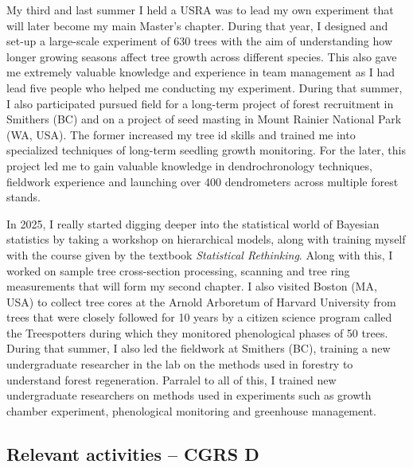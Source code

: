 \documentclass{article}
\begin{document}
My third and last summer I held a USRA was to lead my own experiment that will later become my main Master's chapter. During that year, I designed and set-up a large-scale experiment of 630 trees with the aim of understanding how longer growing seasons affect tree growth across different species. This also gave me extremely valuable knowledge and experience in team management as I had lead five people who helped me conducting my experiment. During that summer, I also participated pursued field for a long-term project of forest recruitment in Smithers (BC) and on a project of seed masting in Mount Rainier National Park (WA, USA). The former increased my tree id skills and trained me into specialized techniques of long-term seedling growth monitoring. For the later, this project led me to gain valuable knowledge in dendrochronology techniques, fieldwork experience and launching over 400 dendrometers across multiple forest stands. 

In 2025, I really started digging deeper into the statistical world of Bayesian statistics by taking a workshop on hierarchical models, along with training myself with the course given by the textbook \textit{Statistical Rethinking}. Along with this, I worked on sample tree cross-section processing, scanning and tree ring measurements that will form my second chapter. I also visited Boston (MA, USA) to collect tree cores at the Arnold Arboretum of Harvard University from trees that were closely followed for 10 years by a citizen science program called the Treespotters during which they monitored phenological phases of 50 trees. During that summer, I also led the fieldwork at Smithers (BC), training a new undergraduate researcher in the lab on the methods used in forestry to understand forest regeneration. Parralel to all of this, I trained new undergraduate researchers on methods used in experiments such as growth chamber experiment, phenological monitoring and greenhouse management. 

\subsection*{Relevant activities – CGRS D}
\end{document}
